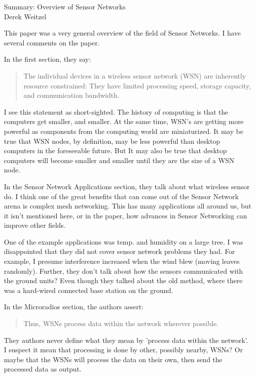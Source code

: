 \documentclass[12pt]{article}
\begin{document}
\begin{center}
{\huge Summary: Overview of Sensor Networks } \\
Derek Weitzel
\end{center}


This paper was a very general overview of the field of Sensor Networks.  I have several comments on the paper.

In the first section, they say:
\begin{quote}
The individual devices in a wireless sensor network (WSN) are inherently resource constrained: They have limited processing speed, storage capacity, and communication bandwidth.
\end{quote}
I see this statement as short-sighted.  The history of computing is that the computers get smaller, and smaller.  At the same time, WSN's are getting more powerful as components from the computing world are miniaturized.  It may be true that WSN nodes, by definition, may be less powerful than desktop computers in the foreseeable future.  But It may also be true that desktop computers will become smaller and smaller until they are the size of a WSN node.

In the Sensor Network Applications section, they talk about what wireless sensor do.  I think one of the great benefits that can come out of the Sensor Network arena is complex mesh networking.  This has many applications all around us, but it isn't mentioned here, or in the paper, how advances in Sensor Networking can improve other fields.

One of the example applications was temp. and humidity on a large tree.  I was disappointed that they did not cover sensor network problems they had.  For example, I presume interference increased when the wind blew (moving leaves randomly).   Further, they don't talk about how the sensors communicated with the ground units?  Even though they talked about the old method, where there was a hard-wired connected base station on the ground.

In the Microradios section, the authors assert:
\begin{quote}
Thus, WSNs process data within the network wherever possible.
\end{quote}
They authors never define what they mean by 'process data within the network'.  I suspect it mean that processing is done by other, possibly nearby, WSNs?  Or maybe that the WSNs will process the data on their own, then send the processed data as output.
\end{document}
